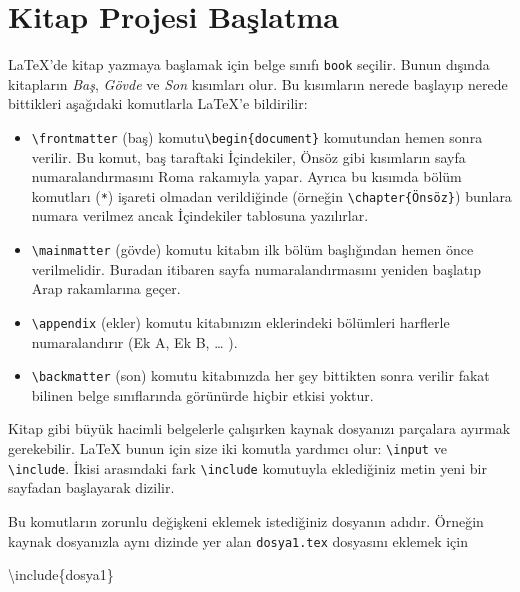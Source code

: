 \documentclass[
  10pt,
]{scrbook}
\newenvironment{Shaded}{\begin{snugshade}}{\end{snugshade}}
\newcommand{\BuiltInTok}[1]{#1}
\newcommand{\ExtensionTok}[1]{#1}
\newcommand{\NormalTok}[1]{#1}
\providecommand{\tightlist}{%
  \setlength{\itemsep}{0pt}\setlength{\parskip}{0pt}}
\theoremstyle{definition}
\theoremstyle{definition}
\theoremstyle{definition}
\theoremstyle{definition}
\theoremstyle{remark}
\begin{document}
\hypertarget{kitap-projesi-baux15flatma}{%
\section{Kitap Projesi Başlatma}\label{kitap-projesi-baux15flatma}}

LaTeX'de kitap yazmaya başlamak için belge sınıfı \texttt{book} seçilir. Bunun dışında kitapların \emph{Baş}, \emph{Gövde} ve \emph{Son} kısımları olur. Bu kısımların nerede başlayıp nerede bittikleri aşağıdaki komutlarla LaTeX'e bildirilir:

\begin{itemize}
\tightlist
\item
  \texttt{\textbackslash{}frontmatter} (baş) komutu\texttt{\textbackslash{}begin\{document\}} komutundan hemen sonra verilir. Bu komut, baş taraftaki İçindekiler, Önsöz gibi kısımların sayfa numaralandırmasını Roma rakamıyla yapar. Ayrıca bu kısımda bölüm komutları (\texttt{*}) işareti olmadan verildiğinde (örneğin \texttt{\textbackslash{}chapter\{Önsöz\}}) bunlara numara verilmez ancak İçindekiler tablosuna yazılırlar.
\item
  \texttt{\textbackslash{}mainmatter} (gövde) komutu kitabın ilk bölüm başlığından hemen önce verilmelidir. Buradan itibaren sayfa numaralandırmasını yeniden başlatıp Arap rakamlarına geçer.
\item
  \texttt{\textbackslash{}appendix} (ekler) komutu kitabınızın eklerindeki bölümleri harflerle numaralandırır (Ek A, Ek B, \ldots{} ).
\item
  \texttt{\textbackslash{}backmatter} (son) komutu kitabınızda her şey bittikten sonra verilir fakat bilinen belge sınıflarında görünürde hiçbir etkisi yoktur.
\end{itemize}

Kitap gibi büyük hacimli belgelerle çalışırken kaynak dosyanızı parçalara ayırmak gerekebilir. LaTeX bunun için size iki komutla yardımcı olur: \texttt{\textbackslash{}input} ve \texttt{\textbackslash{}include}. İkisi arasındaki fark \texttt{\textbackslash{}include} komutuyla eklediğiniz metin yeni bir sayfadan başlayarak dizilir.

Bu komutların zorunlu değişkeni eklemek istediğiniz dosyanın adıdır. Örneğin kaynak dosyanızla aynı dizinde yer alan \texttt{dosya1.tex} dosyasını eklemek için

\begin{Shaded}
\begin{Highlighting}[]
\BuiltInTok{\textbackslash{}include}\NormalTok{\{}\ExtensionTok{dosya1}\NormalTok{\}}
\end{Highlighting}
\end{Shaded}
\end{document}
